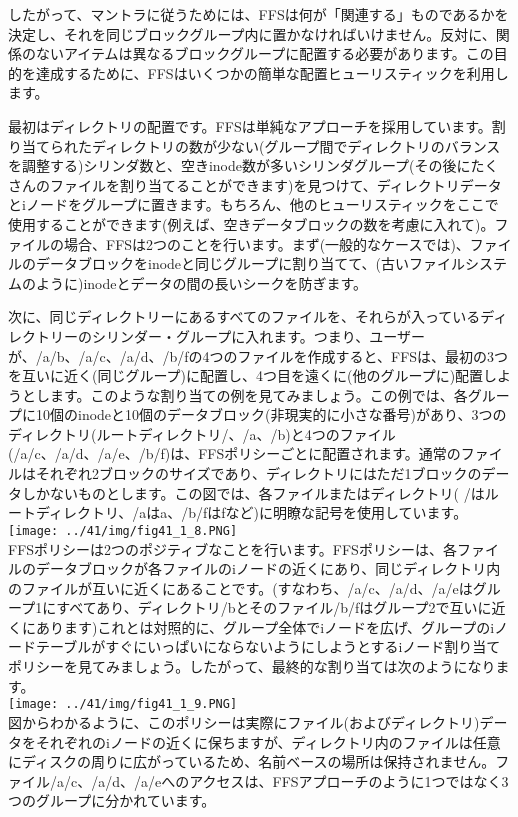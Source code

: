 したがって、マントラに従うためには、FFSは何が「関連する」ものであるかを決定し、それを同じブロックグループ内に置かなければいけません。反対に、関係のないアイテムは異なるブロックグループに配置する必要があります。この目的を達成するために、FFSはいくつかの簡単な配置ヒューリスティックを利用します。

最初はディレクトリの配置です。FFSは単純なアプローチを採用しています。割り当てられたディレクトリの数が少ない(グループ間でディレクトリのバランスを調整する)シリンダ数と、空きinode数が多いシリンダグループ(その後にたくさんのファイルを割り当てることができます)を見つけて、ディレクトリデータとiノードをグループに置きます。もちろん、他のヒューリスティックをここで使用することができます(例えば、空きデータブロックの数を考慮に入れて)。ファイルの場合、FFSは2つのことを行います。まず(一般的なケースでは)、ファイルのデータブロックをinodeと同じグループに割り当てて、(古いファイルシステムのように)inodeとデータの間の長いシークを防ぎます。

次に、同じディレクトリーにあるすべてのファイルを、それらが入っているディレクトリーのシリンダー・グループに入れます。つまり、ユーザーが、/a/b、/a/c、/a/d、/b/fの4つのファイルを作成すると、FFSは、最初の3つを互いに近く(同じグループ)に配置し、4つ目を遠くに(他のグループに)配置しようとします。このような割り当ての例を見てみましょう。この例では、各グループに10個のinodeと10個のデータブロック(非現実的に小さな番号)があり、3つのディレクトリ(ルートディレクトリ/、/a、/b)と4つのファイル(/a/c、/a/d、/a/e、/b/f)は、FFSポリシーごとに配置されます。通常のファイルはそれぞれ2ブロックのサイズであり、ディレクトリにはただ1ブロックのデータしかないものとします。この図では、各ファイルまたはディレクトリ(
/はルートディレクトリ、/aはa、/b/fはfなど)に明瞭な記号を使用しています。\\
\texttt{[image: ../41/img/fig41\_1\_8.PNG]}\\
FFSポリシーは2つのポジティブなことを行います。FFSポリシーは、各ファイルのデータブロックが各ファイルのiノードの近くにあり、同じディレクトリ内のファイルが互いに近くにあることです。(すなわち、/a/c、/a/d、/a/eはグループ1にすべてあり、ディレクトリ/bとそのファイル/b/fはグループ2で互いに近くにあります)これとは対照的に、グループ全体でiノードを広げ、グループのiノードテーブルがすぐにいっぱいにならないようにしようとするiノード割り当てポリシーを見てみましょう。したがって、最終的な割り当ては次のようになります。\\
\texttt{[image: ../41/img/fig41\_1\_9.PNG]}\\
図からわかるように、このポリシーは実際にファイル(およびディレクトリ)データをそれぞれのiノードの近くに保ちますが、ディレクトリ内のファイルは任意にディスクの周りに広がっているため、名前ベースの場所は保持されません。ファイル/a/c、/a/d、/a/eへのアクセスは、FFSアプローチのように1つではなく3つのグループに分かれています。

